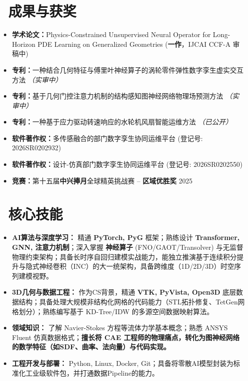 \documentclass[11pt]{article}
\begin{document}
\section{%
    \makebox[\widthof{\faTrophy}][c]%
    {\color{CVBlue}\faTrophy}\ 成果与获奖%
}

\begin{itemize}
    \item \textbf{学术论文：}Physics-Constrained Unsupervised Neural Operator for Long-Horizon PDE Learning on Generalized Geometries (\textbf{一作}，IJCAI CCF-A 审稿中)
    \item \textbf{专利：}一种结合几何特征与傅里叶神经算子的涡轮零件弹性数字孪生虚实交互方法 \textit{（实审中）}
    \item \textbf{专利：}基于几何门控注意力机制的结构感知图神经网络物理场预测方法 \textit{（实审中）}
    \item \textbf{专利：}一种基于应力驱动转速响应的水轮机风扇智能运维方法 \textit{（已公开）}
    \item \textbf{软件著作权：}多传感融合的部门数字孪生协同运维平台 (登记号: 2026SR0202932)
    \item \textbf{软件著作权：}设计-仿真部门数字孪生协同运维平台 (登记号: 2026SR0202550)
    \item \textbf{竞赛：}第十五届\textbf{中兴捧月}全球精英挑战赛 -- \textbf{区域优胜奖} \hfill 2025
\end{itemize}

  
\section{\makebox[\widthof{\faCogs}][c]{\color{CVBlue}\faCogs}\ 核心技能}
\begin{itemize}
    \item \textbf{AI算法与深度学习：} 精通 \textbf{PyTorch, PyG} 框架；熟练设计 \textbf{Transformer, GNN, 注意力机制}；深入掌握 \textbf{神经算子} (FNO/GAOT/Transolver) 与无监督物理约束架构；具备长时序自回归建模实战能力，能独立推演基于连续积分提升与隐式神经卷积（INC）的大一统架构，具备跨维度（1D/2D/3D）时空序列建模视野。
    \item \textbf{3D几何与数据工程：} 作为CS背景，精通 \textbf{VTK, PyVista, Open3D} 底层数据结构；具备处理大规模非结构化网格的代码能力（STL拓扑修复、TetGen网格划分）；熟练编写基于 KD-Tree/IDW 的多源空间数据映射算法。
    \item \textbf{领域知识：} 了解 Navier-Stokes 方程等流体力学基本概念；熟悉 ANSYS Fluent 仿真数据格式；\textbf{擅长将 CAE 工程师的物理痛点，转化为图神经网络的数学特征（如SDF、曲率、法向量）与代码实现。}
    \item \textbf{工程开发与部署：} Python, Linux, Docker, Git；具备将零散AI模型封装为标准化工业级软件包，并打通数据Pipeline的能力。
\end{itemize}
\end{document}

